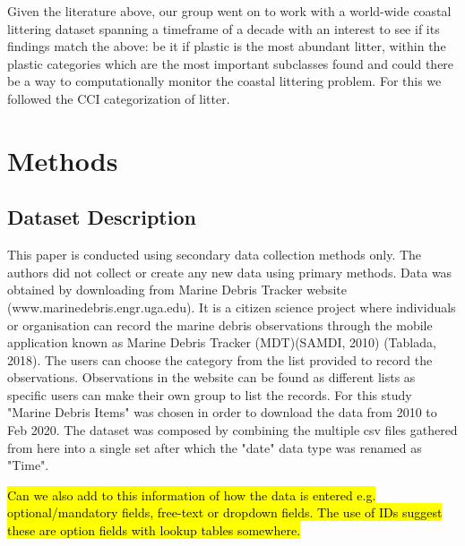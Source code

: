 \documentclass[10pt]{article}\usepackage[]{graphicx}\usepackage[]{color}
\begin{document}
Given the literature above, our group went on to work with a world-wide coastal littering dataset spanning a timeframe of a decade with an interest to see if its findings match the above: be it if plastic is the most abundant litter, within the plastic categories which are the most important subclasses found and could there be a way to computationally monitor the coastal littering problem. For this we followed the CCI categorization of litter.
















\pagebreak
\section {Methods}\label{methods}

\subsection{Dataset Description}\label{dataset}

This paper is conducted using secondary data collection methods only. The authors did not collect or create any new data using primary methods. Data was obtained by downloading from Marine Debris Tracker website (www.marinedebris.engr.uga.edu). It is a citizen science project where individuals or organisation can record the marine debris observations through the mobile application known as Marine Debris Tracker (MDT)(SAMDI, 2010) (Tablada, 2018). The users can choose the category from the list provided to record the observations. Observations in the website can be found as different lists as specific users can make their own group to list the records. For this study "Marine Debris Items" was chosen in order to download the data from 2010 to Feb 2020. The dataset was composed by combining the multiple csv files gathered from here into a single set after which the  "date" data type was renamed as "Time".

\hl{Can we also add to this information of how the data is entered e.g. optional/mandatory fields, free-text or dropdown fields. The use of IDs suggest these are option fields with lookup tables somewhere.}
\end{document}
